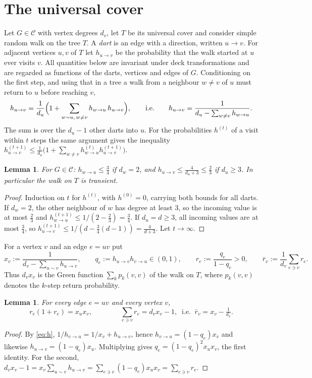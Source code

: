 \documentclass[11pt]{amsart}
\theoremstyle{plain}
\newtheorem{lemma}[theorem]{Lemma}
\theoremstyle{remark}
\newcommand{\cC}{\mathcal{C}}
\newcommand{\rb}{\bar r}
\begin{document}
\section{The universal cover}\label{sec:cover}

Let $G\in\cC$ with vertex degrees $d_v$, let $T$ be its universal cover and consider simple random walk on the
tree $T$. A \emph{dart} is an edge with a direction, written $u\to v$. For adjacent vertices $u,v$ of $T$ let
$h_{u\to v}$ be the probability that the walk started at $u$ ever visits $v$. All quantities below are invariant under deck transformations and are regarded as functions of
the darts, vertices and edges of $G$. Conditioning on the first step, and using that in a tree a walk from a
neighbour $w\ne v$ of $u$ must return to $u$ before reaching $v$,
\begin{equation}\label{eq:h}
 h_{u\to v}=\frac1{d_u}\Bigl(1+\sum_{w\sim u,\,w\ne v}h_{w\to u}\,h_{u\to v}\Bigr),\qquad\text{i.e.}\qquad
 h_{u\to v}=\frac1{d_u-\sum_{w\ne v}h_{w\to u}} .
\end{equation}
The sum is over the $d_u-1$ other darts into $u$. For the probabilities $h^{(t)}$ of a visit within $t$ steps the
same argument gives the inequality
$h^{(t+1)}_{u\to v}\le\frac1{d_u}\bigl(1+\sum_{w\ne v}h^{(t)}_{w\to u}h^{(t+1)}_{u\to v}\bigr)$.

\begin{lemma}\label{lem:apriori}
For $G\in\cC$: $h_{w\to u}\le\frac34$ if $d_w=2$, and $h_{u\to v}\le\frac4{d_u+3}\le\frac23$ if $d_u\ge3$. In
particular the walk on $T$ is transient.
\end{lemma}
\begin{proof}
Induction on $t$ for $h^{(t)}$, with $h^{(0)}=0$, carrying both bounds for all darts. If $d_w=2$, the other
neighbour of $w$ has degree at least $3$, so the incoming value is at most $\frac23$ and
$h^{(t+1)}_{w\to u}\le1/(2-\frac23)=\frac34$. If $d_u=d\ge3$, all incoming values are at most $\frac34$, so
$h^{(t+1)}_{u\to v}\le1/(d-\frac34(d-1))=\frac4{d+3}$. Let $t\to\infty$.
\end{proof}

For a vertex $v$ and an edge $e=uv$ put
\[
 x_v:=\frac1{d_v-\sum_{u\sim v}h_{u\to v}},\qquad q_e:=h_{u\to v}h_{v\to u}\in(0,1),\qquad
 r_e:=\frac{q_e}{1-q_e}>0,\qquad \rb_v:=\frac1{d_v}\sum_{e\ni v}r_e .
\]
Thus $d_vx_v$ is the Green function $\sum_kp_k(v,v)$ of the walk on $T$, where $p_k(v,v)$ denotes the $k$-step
return probability.

\begin{lemma}\label{lem:ident}
For every edge $e=uv$ and every vertex $v$,
\begin{equation}\label{eq:I}
 r_e(1+r_e)=x_ux_v,\qquad\qquad \sum_{e\ni v}r_e=d_vx_v-1,\ \text{ i.e. }\ \rb_v=x_v-\tfrac1{d_v}.
\end{equation}
\end{lemma}
\begin{proof}
By \eqref{eq:h}, $1/h_{v\to u}=1/x_v+h_{u\to v}$, hence $h_{v\to u}=(1-q_e)x_v$ and likewise
$h_{u\to v}=(1-q_e)x_u$. Multiplying gives $q_e=(1-q_e)^2x_ux_v$, the first identity. For the second,
$d_vx_v-1=x_v\sum_{u\sim v}h_{u\to v}=\sum_{e\ni v}(1-q_e)x_ux_v=\sum_{e\ni v}r_e$.
\end{proof}
\end{document}
